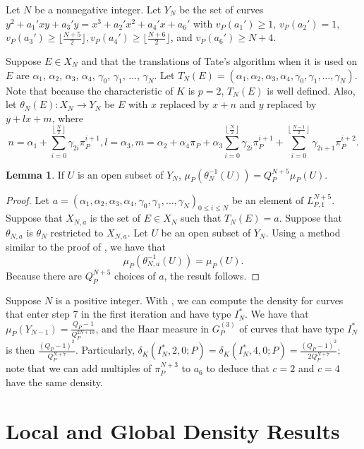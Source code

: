 \documentclass[12pt,letterpaper]{amsart}
\theoremstyle{definition}
\newtheorem{lemma}[theorem]{Lemma}
\begin{document}
Let $N$ be a nonnegative integer. Let $Y_N$ be the set of curves $y^2+a_1'xy+a_3'y=x^3+a_2'x^2+a_4'x+a_6'$ with $v_P(a_1')\geq 1$, $v_P(a_2')=1$, $v_P(a_3')\geq\lfloor\frac{N+5}{2}\rfloor, v_P(a_4')\geq \lfloor\frac{N+6}{2}\rfloor$, and $v_P(a_6')\geq N+4$.

Suppose $E\in X_N$ and that the translations of Tate's algorithm when it is used on $E$ are $\alpha_1$, $\alpha_2$, $\alpha_3$, $\alpha_4$, $\gamma_0$, $\gamma_1$, $\ldots$, $\gamma_N$. Let $T_N(E)=(\alpha_1,\alpha_2,\alpha_3,\alpha_4,\gamma_0,\gamma_1,\ldots,\gamma_N)$. Note that because the characteristic of $K$ is $p=2$, $T_N(E)$ is well defined. Also, let $\theta_N(E): X_N\rightarrow Y_N$ be $E$ with $x$ replaced by $x+n$ and $y$ replaced by $y+l x+m$, where 
\[
    n = \alpha_1+\sum_{i=0}^{\left\lfloor\frac{N}{2}\right\rfloor}\gamma_{2i}\pi_P^{i+1}, l = \alpha_3, m = \alpha_2+\alpha_4\pi_P+\alpha_3\sum_{i=0}^{\left\lfloor\frac{N}{2}\right\rfloor}\gamma_{2i}\pi_P^{i+1}+\sum_{i=0}^{\left\lfloor\frac{N-1}{2}\right\rfloor}\gamma_{2i+1}\pi_P^{i+2}.
\]

\begin{lemma}
\label{invdensitysub3}
If $U$ is an open subset of $Y_N$, $\mu_P(\theta_N^{-1}(U))=Q_P^{N+5}\mu_P(U)$.
\end{lemma}

\begin{proof}
Let $a=(\alpha_1,\alpha_2,\alpha_3,\alpha_4, \gamma_0, \gamma_1,\ldots, \gamma_N)_{0\leq i\leq N}$ be an element of $L_{P,1}^{N+5}$. Suppose that $X_{N,a}$ is the set of $E\in X_N$ such that $T_N(E)=a$. Suppose that $\theta_{N,a}$ is $\theta_N$ restricted to $X_{N,a}$. Let $U$ be an open subset of $Y_N$. Using a method similar to the proof of , we have that
\[
\mu_P(\theta_{N,a}^{-1}(U)) = \mu_P(U).
\]
Because there are $Q_P^{N+5}$ choices of $a$, the result follows.
\end{proof}

Suppose $N$ is a positive integer. With , we can compute the density for curves that enter step 7 in the first iteration and have type $I_N^*$. We have that $\mu_P(Y_{N-1})=\frac{Q_P-1}{Q_P^{2N+10}}$, and the Haar measure in $G_P^{(3)}$ of curves that have type $I_N^*$ is then $\frac{(Q_P-1)^2}{Q_P^{N+7}}$. Particularly, $\delta_K(I_N^*, 2, 0; P)=\delta_K(I_N^*, 4, 0; P)=\frac{(Q_P-1)^2}{2Q_P^{N+7}}$; note that we can add multiples of $\pi_P^{N+3}$ to $a_6$ to deduce that $c=2$ and $c=4$ have the same density.

\section{Local and Global Density Results}
\label{sec:results}
\end{document}
